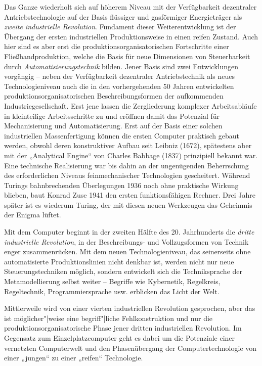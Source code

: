 \documentclass[11pt,a4paper]{article}
\begin{document}
Das Ganze wiederholt sich auf höherem Niveau mit der Verfügbarkeit dezentraler
Antriebstechnologie auf der Basis flüssiger und gasförmiger Energieträger als
\emph{zweite industrielle Revolution}. Fundament dieser Weiterentwicklung ist
der Übergang der ersten industriellen Produktionsweise in einen reifen
Zustand.  Auch hier sind es aber erst die produktionsorganisatorischen
Fortschritte einer Fließbandproduktion, welche die Basis für neue Dimensionen
von Steuerbarkeit durch \emph{Automatisierungstechnik} bilden.  Jener Basis
sind zwei Entwicklungen vorgängig -- neben der Verfügbarkeit dezentraler
Antriebstechnik als neues Technologieniveau auch die in den vorhergehenden 50
Jahren entwickelten produktionsorganisatorischen Beschreibungsformen der
aufkommenden Industriegesellschaft.  Erst jene lassen die Zergliederung
komplexer Arbeitsabläufe in kleinteilige Arbeitsschritte zu und eröffnen damit
das Potenzial für Mechanisierung und Automatisierung. Erst auf der Basis einer
solchen industriellen Massenfertigung können die ersten Computer praktisch
gebaut werden, obwohl deren konstruktiver Aufbau seit Leibniz (1672),
spätestens aber mit der „Analytical Engine“ von Charles Babbage (1837)
prinzipiell bekannt war. Eine technische Realisierung war bis dahin an der
ungenügenden Beherrschung des erforderlichen Niveaus feinmechanischer
Technologien gescheitert.  Während Turings bahnbrechenden Überlegungen 1936
noch ohne praktische Wirkung blieben, baut Konrad Zuse 1941 den ersten
funktionsfähigen Rechner. Drei Jahre später ist es wiederum Turing, der mit
diesen neuen Werkzeugen das Geheimnis der Enigma lüftet.

Mit dem Computer beginnt in der zweiten Hälfte des 20. Jahrhunderts die
\emph{dritte industrielle Revolution}, in der Beschreibungs- und
Vollzugsformen von Technik enger zusammenrücken. Mit dem neuen
Technologieniveau, das seinerseits ohne automatisierte Produktionslinien nicht
denkbar ist, werden nicht nur neue Steuerungstechniken möglich, sondern
entwickelt sich die Techniksprache der Metamodellierung selbst weiter --
Begriffe wie Kybernetik, Regelkreis, Regeltechnik, Programmiersprache usw.
erblicken das Licht  der Welt.

Mittlerweile wird von einer vierten industriellen Revolution gesprochen, aber
das ist möglicher"|weise eine begriff"|liche Fehlkonstruktion und nur die
produktionsorganisatorische Phase jener dritten industriellen Revolution. Im
Gegensatz zum Einzelplatzcomputer geht es dabei um die Potenziale einer
vernetzten Computerwelt und den Phasenübergang der Computertechnologie von
einer „jungen“ zu einer „reifen“ Technologie.
\end{document}
